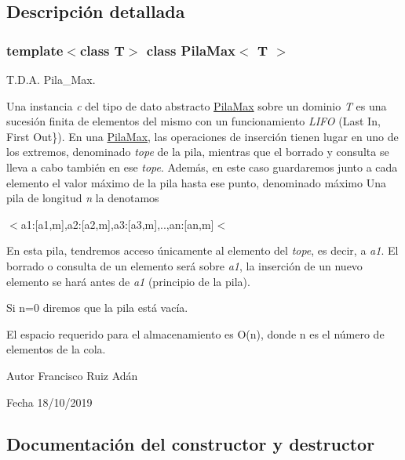 \subsection{Descripción detallada}
\subsubsection*{template$<$class T$>$\newline
class Pila\+Max$<$ T $>$}

T.\+D.\+A. Pila\+\_\+\+Max. 

Una instancia {\itshape c} del tipo de dato abstracto \hyperlink{classPilaMax}{Pila\+Max} sobre un dominio {\itshape T} es una sucesión finita de elementos del mismo con un funcionamiento {\itshape L\+I\+FO} (Last In, First Out\}). En una \hyperlink{classPilaMax}{Pila\+Max}, las operaciones de inserción tienen lugar en uno de los extremos, denominado {\itshape tope} de la pila, mientras que el borrado y consulta se lleva a cabo también en ese {\itshape tope}. Además, en este caso guardaremos junto a cada elemento el valor máximo de la pila hasta ese punto, denominado máximo Una pila de longitud {\itshape n} la denotamos


\begin{DoxyItemize}
\item $<$a1\+:\mbox{[}a1,m\mbox{]},a2\+:\mbox{[}a2,m\mbox{]},a3\+:\mbox{[}a3,m\mbox{]},..,an\+:\mbox{[}an,m\mbox{]}$<$
\end{DoxyItemize}

En esta pila, tendremos acceso únicamente al elemento del {\itshape tope}, es decir, a {\itshape a1}. El borrado o consulta de un elemento será sobre {\itshape a1}, la inserción de un nuevo elemento se hará antes de {\itshape a1} (principio de la pila).

Si n=0 diremos que la pila está vacía.

El espacio requerido para el almacenamiento es O(n), donde n es el número de elementos de la cola.

\begin{DoxyAuthor}{Autor}
Francisco Ruiz Adán 
\end{DoxyAuthor}
\begin{DoxyDate}{Fecha}
18/10/2019 
\end{DoxyDate}


\subsection{Documentación del constructor y destructor}
\mbox{\label{classPilaMax_abbc833df3e55f3c4b8fc02fca156ca16}} 
